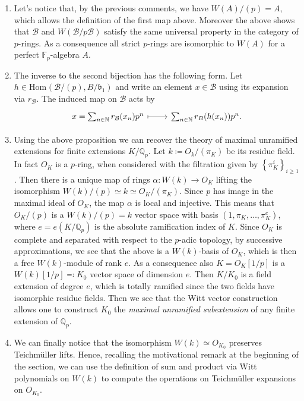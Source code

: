 \begin{rem}[]\leavevmode\vspace{-.2\baselineskip}
\begin{enumerate}
\item Let's notice that, by the previous comments, we have
	$W(A)/ (p) = A$, which allows the definition of the first map above.
	Moreover the above shows that $\mathcal{B}$ and $W(\mathcal{B}/p \mathcal{B})$
	satisfy the same universal property in the category of $p$-rings.
	As a consequence all strict $p$-rings are isomorphic to $W(A)$ for
	a perfect $\mathbb{F}_p$-algebra $A$.

\item The inverse to the second bijection has the following form.
	Let $h \in \mathrm{Hom}_{  } \left( \mathcal{B}/ (p), B/\mathfrak{b}_1 \right)$
	and write an element $x \in \mathcal{B}$ using its expansion via $r_{\mathcal{B}}$.
	The induced map on $\mathcal{B}$ acts by
	\begin{equation*}
	\begin{tikzcd}[row sep = 0ex
		,/tikz/column 1/.append style={anchor=base east}
		,/tikz/column 2/.append style={anchor=base west}]
		x = \sum_{n \in \mathbb{N} }^{  } r_{\mathcal{B}}(x_n) p^n 
		\arrow[r, "", mapsto] & 
		\sum_{n \in \mathbb{N} }^{  } r_B(h(x_n)) p^n
	.\end{tikzcd}
	\end{equation*} 

\item Using the above proposition we can recover the theory of maximal unramified
	extensions for finite extensions $K/\mathbb{Q}_p$.
	Let $k \coloneqq O_k/ (\pi_K)$ be its residue field.
	In fact $O_K$ is a $p$-ring, when considered with the filtration
	given by $\left\{ \pi_K^i \right\}_{i \geq 1}$.
	Then there is a unique map of rings $\alpha\colon W(k) \to O_K$
	lifting the isomorphism $W(k)/ (p) \simeq k \simeq O_K/ (\pi_K)$.
	Since $p$ has image in the maximal ideal of $O_K$,
	the map $\alpha$ is local and injective.
	This means that $O_K/ (p)$ is a $W(k)/ (p) = k$ vector space
	with basis $\left(1, \pi_K, \ldots, \pi_K^e\right)$,
	where $e = e(K/\mathbb{Q}_p)$ is the absolute ramification
	index of $K$.
	Since $O_K$ is complete and separated with respect to the $p$-adic topology,
	by successive approximations, we see that the above is a
	$W(k)$-basis of $O_K$, which is then a free $W(k)$-module
	of rank $e$.
	As a consequence also $K = O_K[1/p]$ is a $W(k)[1/p] \eqqcolon K_0$
	vector space of dimension $e$.
	Then $K/K_0$ is a field extension of degree $e$, which is totally ramified
	since the two fields have isomorphic residue fields.
	Then we see that the Witt vector construction allows one to
	construct $K_0$ the {\em maximal unramified subextension} of any
	finite extension of $\mathbb{Q}_p$.

\item We can finally notice that the isomorphism $W(k) \simeq O_{K_0}$ preserves
	Teichmüller lifts. Hence, recalling the motivational remark at the beginning
	of the section, we can use the definition of sum and product via
	Witt polynomials on $W(k)$ to compute the operations on
	Teichmüller expansions on $O_{K_0}$.
\end{enumerate}
\end{rem}

